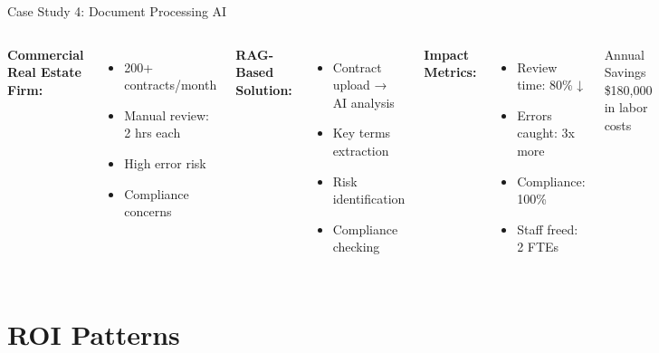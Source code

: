 \documentclass{beamer}
\begin{document}
\begin{frame}{Case Study 4: Document Processing AI}
  \begin{columns}[onlytextwidth]
      \textbf{Commercial Real Estate Firm:}
      \begin{itemize}
        \item 200+ contracts/month
        \item Manual review: 2 hrs each
        \item High error risk
        \item Compliance concerns
      \end{itemize}
      
      \textbf{RAG-Based Solution:}
      \begin{itemize}
        \item Contract upload → AI analysis
        \item Key terms extraction
        \item Risk identification
        \item Compliance checking
      \end{itemize}
    
      \textbf{Impact Metrics:}
      \begin{itemize}
        \item Review time: 80\% ↓
        \item Errors caught: 3x more
        \item Compliance: 100\%
        \item Staff freed: 2 FTEs
      \end{itemize}
      
      \begin{block}{Annual Savings}
        \$180,000 in labor costs
      \end{block}
  \end{columns}
\end{frame}

\section{ROI Patterns}
\end{document}
